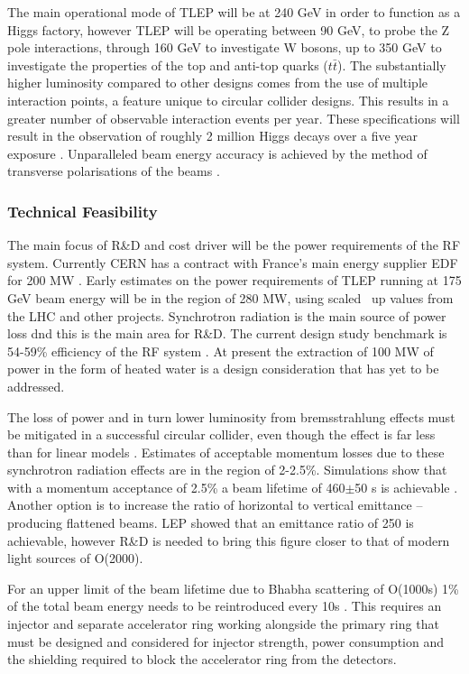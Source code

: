 The main operational mode of TLEP will be at 240 GeV in order to function as a Higgs factory, however TLEP will be operating between 90 GeV, to probe the Z pole interactions, through 160 GeV to investigate W bosons, up to 350 GeV to investigate the properties of the top and anti-top quarks ($t\bar{t}$). The substantially higher luminosity compared to other designs comes from the use of multiple interaction points, a feature unique to circular collider designs. This results in a greater number of observable interaction events per year. These specifications will result in the observation of roughly 2 million Higgs decays over a five year exposure \cite{TLEP:CERNReport}. Unparalleled beam energy accuracy is achieved by the method of transverse polarisations of the beams \cite{TLEP:Review}.

\subsubsection{Technical Feasibility}

The main focus of R\&D and cost driver will be the power requirements of the RF system. Currently CERN has a contract with France's main energy supplier EDF for 200 MW \cite{TLEP:Luminosity}. Early estimates on the power requirements of TLEP running at 175 GeV beam energy will be in the region of 280 MW, using scaled \textemdash \, up values from the LHC and other projects. Synchrotron radiation is the main source of power loss dnd this is the main area for R\&D. The current design study benchmark is 54-59\% efficiency of the RF system \cite{TLEP:Review}. At present the extraction of 100 MW of power in the form of heated water is a design consideration that has yet to be addressed.

The loss of power and in turn lower luminosity from bremsstrahlung effects must be mitigated in a successful circular collider, even though the effect is far less than for linear models \cite{TLEP:Luminosity}. Estimates of acceptable momentum losses due to these synchrotron radiation effects are in the region of 2-2.5\%. Simulations show that with a momentum acceptance of 2.5\% a beam lifetime of 460$\pm$50 s is achievable \cite{TLEP:EnergyRestriction}. Another option is to increase the ratio of horizontal to vertical emittance – producing flattened beams. LEP showed that an emittance ratio of 250 is achievable, however R\&D is needed to bring this figure closer to that of modern light sources of O(2000).

For an upper limit of the beam lifetime due to Bhabha scattering of O(1000s) 1\% of the total beam energy needs to be reintroduced every 10s \cite{TLEP:Janot} \cite{TLEP:CERNOverview}. This requires an injector and separate accelerator ring working alongside the primary ring that must be designed and considered for injector strength, power consumption and the shielding required to block the accelerator ring from the detectors. 

